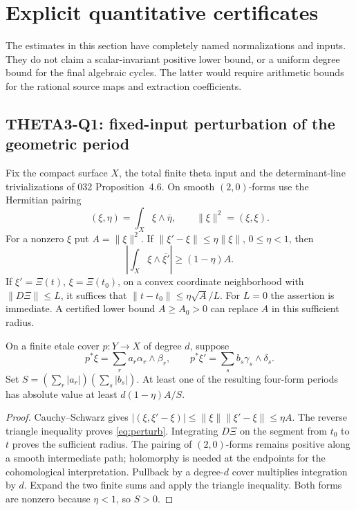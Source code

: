 \section{Explicit quantitative certificates}
\label{sec:quantitative}
The estimates in this section have completely named normalizations and inputs. They do not claim a scalar-invariant positive lower bound, or a uniform degree bound for the final algebraic cycles. The latter would require arithmetic bounds for the rational source maps and extraction coefficients.

\subsection{THETA3-Q1: fixed-input perturbation of the geometric period}\label{Q1}
Fix the compact surface $X$, the total finite theta input and the determinant-line trivializations of 032 Proposition~4.6. On smooth $(2,0)$-forms use the Hermitian pairing
\[
 (\xi,\eta)=\int_X\xi\wedge\overline\eta,
 \qquad \|\xi\|^2=(\xi,\xi).
\]
For a nonzero $\xi$ put $A=\|\xi\|^2$. If
$\|\xi'-\xi\|\leq\eta\|\xi\|$, $0\leq\eta<1$, then
\begin{equation}\label{eq:perturb}
 \left|\int_X\xi\wedge\overline{\xi'}\right|
 \geq (1-\eta)A.
\end{equation}
If $\xi'=\Xi(t)$, $\xi=\Xi(t_0)$, on a convex coordinate neighborhood with $\|D\Xi\|\leq L$, it suffices that
$\|t-t_0\|\leq\eta\sqrt A/L$. For $L=0$ the assertion is immediate. A certified lower bound $A\geq A_0>0$ can replace $A$ in this sufficient radius.

On a finite etale cover $p:Y\to X$ of degree $d$, suppose
\[
 p^*\xi=\sum_r a_r\alpha_r\wedge\beta_r,
 \qquad p^*\xi'=\sum_s b_s\gamma_s\wedge\delta_s.
\]
Set $S=(\sum_r|a_r|)(\sum_s|b_s|)$. At least one of the resulting four-form periods has absolute value at least
$d(1-\eta)A/S$.
\begin{proof}
Cauchy--Schwarz gives
$|(\xi,\xi'-\xi)|\leq\|\xi\|\|\xi'-\xi\|\leq\eta A$.
The reverse triangle inequality proves \eqref{eq:perturb}. Integrating $D\Xi$ on the segment from $t_0$ to $t$ proves the sufficient radius. The pairing of $(2,0)$-forms remains positive along a smooth intermediate path; holomorphy is needed at the endpoints for the cohomological interpretation. Pullback by a degree-$d$ cover multiplies integration by $d$. Expand the two finite sums and apply the triangle inequality. Both forms are nonzero because $\eta<1$, so $S>0$.
\end{proof}

